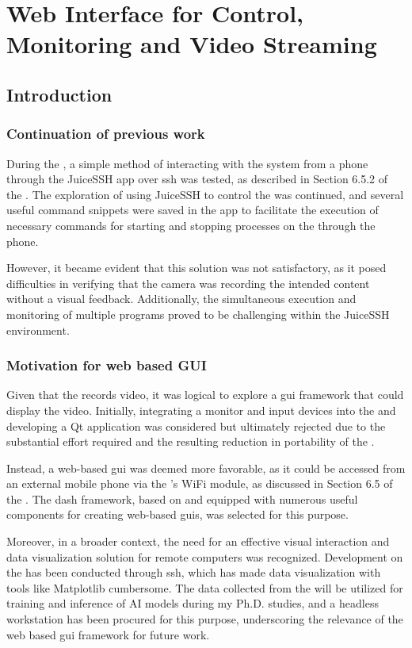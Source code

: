 \chapter{Web Interface for Control, Monitoring and Video Streaming}
\label{chap:gui}
\section{Introduction}
\subsection{Continuation of previous work}
During the \preproject, a simple method of interacting with the system from a phone through the JuiceSSH app over \gls{ssh} was tested, as described in Section 6.5.2 of the \preproject.
The exploration of using JuiceSSH to control the \sr was continued, and several useful command snippets were saved in the app to facilitate the execution of necessary commands for starting and stopping processes on the \jx through the phone.

However, it became evident that this solution was not satisfactory, as it posed difficulties in verifying that the camera was recording the intended content without a visual feedback.
Additionally, the simultaneous execution and monitoring of multiple programs proved to be challenging within the JuiceSSH environment.


\subsection{Motivation for web based GUI}
Given that the \sr records video, it was logical to explore a \gls{gui} framework that could display the video.
Initially, integrating a monitor and input devices into the \sr and developing a Qt application was considered but ultimately rejected due to the substantial effort required and the resulting reduction in portability of the \sr.

Instead, a web-based \gls{gui} was deemed more favorable, as it could be accessed from an external mobile phone via the \sr's WiFi module, as discussed in Section 6.5 of the \preproject.
The \gls{dash} framework, based on \py and equipped with numerous useful components for creating web-based \glspl{gui}, was selected for this purpose.

Moreover, in a broader context, the need for an effective visual interaction and data visualization solution for remote computers was recognized.
Development on the \jx has been conducted through \gls{ssh}, which has made data visualization with tools like Matplotlib cumbersome.
The data collected from the \sr will be utilized for training and inference of AI models during my Ph.D.
studies, and a headless workstation has been procured for this purpose, underscoring the relevance of the web based \gls{gui} framework for future work.



